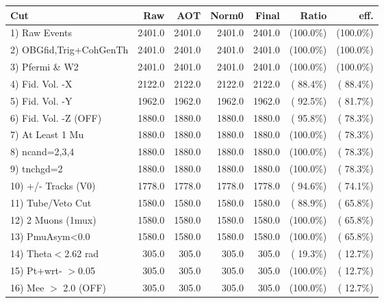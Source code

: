 \begin{table}[h!]\centering
 \begin{tabular}{||l||r|r|r|r|r|r||}
 \hline
 \hline
 Cut & Raw & AOT & Norm0 & Final & Ratio & eff.       \\
 \hline
  1) Raw Events           &       2401.0 &       2401.0 &       2401.0 &       2401.0 & (100.0\%) & (100.0\%) \\
  2) OBGfid,Trig+CohGenTh &       2401.0 &       2401.0 &       2401.0 &       2401.0 & (100.0\%) & (100.0\%) \\
  3) Pfermi \& W2         &       2401.0 &       2401.0 &       2401.0 &       2401.0 & (100.0\%) & (100.0\%) \\
  4) Fid. Vol. -X         &       2122.0 &       2122.0 &       2122.0 &       2122.0 & ( 88.4\%) & ( 88.4\%) \\
  5) Fid. Vol. -Y         &       1962.0 &       1962.0 &       1962.0 &       1962.0 & ( 92.5\%) & ( 81.7\%) \\
  6) Fid. Vol. -Z (OFF)   &       1880.0 &       1880.0 &       1880.0 &       1880.0 & ( 95.8\%) & ( 78.3\%) \\
  7) At Least 1 Mu        &       1880.0 &       1880.0 &       1880.0 &       1880.0 & (100.0\%) & ( 78.3\%) \\
  8) ncand=2,3,4          &       1880.0 &       1880.0 &       1880.0 &       1880.0 & (100.0\%) & ( 78.3\%) \\
  9) tnchgd=2             &       1880.0 &       1880.0 &       1880.0 &       1880.0 & (100.0\%) & ( 78.3\%) \\
 10) +/- Tracks (V0)      &       1778.0 &       1778.0 &       1778.0 &       1778.0 & ( 94.6\%) & ( 74.1\%) \\
 11) Tube/Veto Cut        &       1580.0 &       1580.0 &       1580.0 &       1580.0 & ( 88.9\%) & ( 65.8\%) \\
 12) 2 Muons (1mux)       &       1580.0 &       1580.0 &       1580.0 &       1580.0 & (100.0\%) & ( 65.8\%) \\
 13) PmuAsym<0.0          &       1580.0 &       1580.0 &       1580.0 &       1580.0 & (100.0\%) & ( 65.8\%) \\
 14) Theta$<$2.62 rad     &        305.0 &        305.0 &        305.0 &        305.0 & ( 19.3\%) & ( 12.7\%) \\
 15) Pt+wrt- $>$0.05      &        305.0 &        305.0 &        305.0 &        305.0 & (100.0\%) & ( 12.7\%) \\
 16) Mee $>$ 2.0  (OFF)   &        305.0 &        305.0 &        305.0 &        305.0 & (100.0\%) & ( 12.7\%) \\

\end{tabular}
\end{table}
